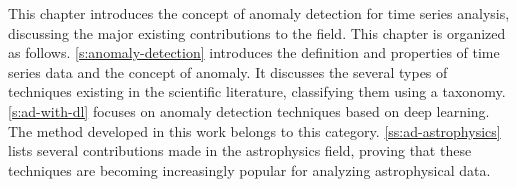 \begin{chapabstract}
\small{
This chapter introduces the concept of anomaly detection for time series analysis, discussing the major existing contributions to the field. This chapter is organized as follows. \autoref{s:anomaly-detection} introduces the definition and properties of time series data and the concept of anomaly. It discusses the several types of techniques existing in the scientific literature, classifying them using a taxonomy. 
\autoref{s:ad-with-dl} focuses on anomaly detection techniques based on deep learning. The method developed in this work belongs to this category.
\autoref{ss:ad-astrophysics} lists several contributions made in the astrophysics field, proving that these techniques are becoming increasingly popular for analyzing astrophysical data.
}\\
\begin{center}
\noindent\makebox[0.8\linewidth]{\rule{0.66\paperwidth}{0.4pt}}
\end{center}
\vspace{1cm}
\end{chapabstract}

